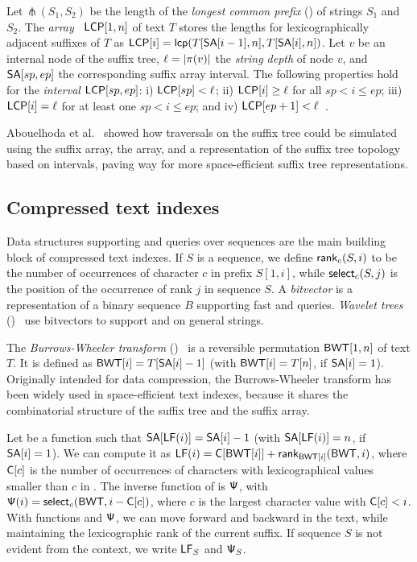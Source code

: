 Let $\mlcp(S_{1}, S_{2})$ be the length of the \emph{longest common prefix}
(\LCP) of strings $S_{1}$ and $S_{2}$. The \LCP{}
\emph{array}~\cite{Manber1993} $\mathsf{LCP}[1,n]$ of text $T$ stores the \LCP{}
lengths for lexicographically adjacent suffixes of $T$ as $\mathsf{LCP}[i] =
\mathsf{lcp}(T[\mathsf{SA}[i-1],n], T[\mathsf{SA}[i],n])$. Let $v$ be an internal node of the
suffix tree, $\ell = \lvert \pi(v) \rvert$ the \emph{string depth} of node $v$, and
$\mathsf{SA}[sp,ep]$ the corresponding suffix array interval. The following
properties hold for the \LCP{} \emph{interval} $\mathsf{LCP}[sp,ep]$: i) $\mathsf{LCP}[sp] <
\ell$; ii) $\mathsf{LCP}[i] \ge \ell$ for all $sp < i \le ep$; iii) $\mathsf{LCP}[i] = \ell$
for at least one $sp < i \le ep$; and iv) $\mathsf{LCP}[ep+1] <
\ell$~\cite{Abouelhoda2004}.

Abouelhoda et al.~\cite{Abouelhoda2004} showed how traversals on the suffix
tree could be simulated using the suffix array, the \LCP{} array, and a
representation of the suffix tree topology based on \LCP{} intervals, paving
way for more space-efficient suffix tree representations.

\subsection{Compressed text indexes}

Data structures supporting \rank{} and \select{} queries over sequences are
the main building block of compressed text indexes. If $S$ is a sequence, we
define $\mathsf{rank}_{c}(S,i)$ to be the number of occurrences of character $c$ in
prefix $S[1,i]$, while $\mathsf{select}_{c}(S,j)$ is the position of the occurrence
of rank $j$ in sequence $S$. A \emph{bitvector} is a representation of a
binary sequence $B$ supporting fast \rank{} and \select{} queries.
\emph{Wavelet trees} (\WT)~\cite{Grossi2003} use bitvectors to support \rank{}
and \select{} on general strings.

The \emph{Burrows-Wheeler transform} (\BWT)~\cite{Burrows1994} is a reversible
permutation $\mathsf{BWT}[1,n]$ of text $T$. It is defined as $\mathsf{BWT}[i] = T[\mathsf{SA}[i] -
1]$ (with $\mathsf{BWT}[i] = T[n]$, if $\textsf{SA}[i] = 1$). Originally intended for data
compression, the Burrows-Wheeler transform has been widely used in
space-efficient text indexes, because it shares the combinatorial structure of
the suffix tree and the suffix array.

Let \LF{} be a function such that $\mathsf{SA}[\mathsf{LF}(i)] = \mathsf{SA}[i] - 1$ (with
$\mathsf{SA}[\mathsf{LF}(i)] = n$, if $\mathsf{SA}[i] = 1$). We can compute it as $\mathsf{LF}(i) =
\mathsf{C}[\mathsf{BWT}[i]] + \mathsf{rank}_{\mathsf{BWT}[i]}(\mathsf{BWT}, i)$, where $\mathsf{C}[c]$ is the number of
occurrences of characters with lexicographical values smaller than $c$ in
\BWT. The inverse function of \LF{} is $\mathsf{\Psi}$, with $\mathsf{\Psi}(i) =
\mathsf{select}_{c}(\mathsf{BWT}, i - \mathsf{C}[c])$, where $c$ is the largest character value
with $\mathsf{C}[c] < i$. With functions \LF{} and $\mathsf{\Psi}$, we can move forward and
backward in the text, while maintaining the lexicographic rank of the current
suffix. If sequence $S$ is not evident from the context, we write $\mathsf{LF}_{S}$
and $\mathsf{\Psi}_{S}$.

